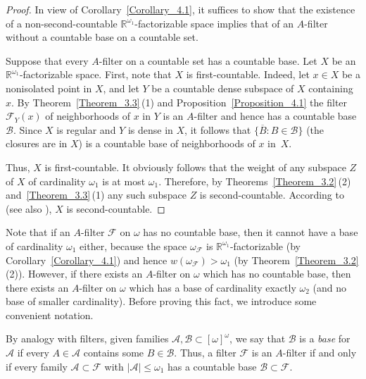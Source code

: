 \documentclass[a4paper,12pt]{amsart}
\theoremstyle{definition}
\theoremstyle{remark}
\begin{document}
\begin{proof}
In view of Corollary~\ref{Corollary_4.1}, it suffices to show that the existence of 
a non-second-countable $\mathbb R^{\omega_1}$-factorizable space implies that of an 
$A$-filter without a countable base on a countable set.  

Suppose that every $A$-filter on a countable set has a countable base. 
Let $X$ be an $\mathbb R^{\omega_1}$-factorizable space. First, note that $X$ is first-countable. Indeed, 
let $x\in X$ be a nonisolated point in $X$, and let $Y$ be a countable dense subspace of $X$ containing $x$. By 
Theorem~\ref{Theorem_3.3}\,(1) and Proposition~\ref{Proposition_4.1} 
the filter $\mathscr F_Y(x)$ of neighborhoods of $x$ in $Y$ is 
an $A$-filter and hence has a countable base $\mathscr B$. Since $X$ is regular and $Y$ is 
dense in $X$, it follows that $\{\overline B: B\in \mathscr B\}$ (the closures are in $X$) 
is a countable base of neighborhoods of $x$ in~$X$.

Thus, $X$ is first-countable. It obviously follows that the weight of any subspace $Z$ of $X$ of cardinality 
$\omega_1$ is at most $\omega_1$. Therefore, by Theorems~\ref{Theorem_3.2}\,(2) and~\ref{Theorem_3.3}\,(1) 
any such subspace $Z$ 
is second-countable. According to \cite[Theorem~1.1]{T_1978} (see also \cite{H-J}), $X$ is second-countable. 
\end{proof}

Note that if an $A$-filter $\mathscr F$ on $\omega$ has no countable base, then it cannot have a base of 
cardinality $\omega_1$ either, because the space $\omega_{\mathscr F}$ is $\mathbb
R^{\omega_1}$-factorizable (by Corollary~\ref{Corollary_4.1}) and  hence $w(\omega_{\mathscr F})>\omega_1$ 
(by Theorem~\ref{Theorem_3.2}\,(2)). However, if there exists an $A$-filter on $\omega$ which has no countable base, 
then there exists an $A$-filter on $\omega$ which has a base of cardinality exactly $\omega_2$ (and no base of 
smaller cardinality). Before proving this fact, we introduce some convenient notation. 

By analogy with filters, given families $\mathscr A,\mathscr B\subset [\omega]^\omega$, we say that $\mathscr B$ 
is a \emph{base} for $\mathscr A$ if every $A\in\mathscr A$ contains some $B\in\mathscr B$. 
Thus, a filter $\mathscr F$ is an $A$-filter if and only if every family $\mathscr A\subset\mathscr F$ 
with $|\mathscr A|\leq\omega_1$ has a countable base $\mathscr B\subset \mathscr F$. 
\end{document}
